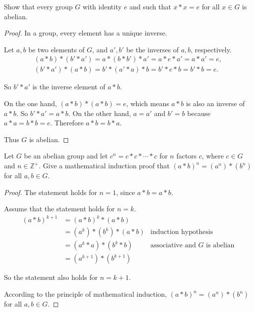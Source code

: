 \newpage
\begin{exercise}
    Show that every group $G$ with identity $e$ and such that $x * x = e$ for all $x\in G$ is abelian.
\end{exercise}

\begin{proof}
    In a group, every element has a unique inverse.

    Let $a, b$ be two elements of $G$, and $a', b'$ be the inverses of $a, b$, respectively.
    \[
        \begin{split}
            (a * b) * (b' * a') = a * (b * b') * a' = a * e * a' = a * a' = e, \\
            (b' * a') * (a * b) = b' * (a' * a) * b = b' * e * b = b' * b = e.
        \end{split}
    \]

    So $b' * a'$ is the inverse element of $a * b$.

    On the one hand, $(a * b) * (a * b) = e$, which means $a * b$ is also an inverse of $a * b$. So $b' * a' = a * b$. On the other hand, $a = a'$ and $b' = b$ because $a * a = b * b = e$. Therefore $a * b = b * a$.

    Thus $G$ is abelian.
\end{proof}

\newpage
\begin{exercise}
    Let $G$ be an abelian group and let $c^{n} = c * c * \cdots * c$ for $n$ factors $c$, where $c\in G$ and $n\in\mathbb{Z}^{+}$. Give a mathematical induction proof that ${(a * b)}^{n} = (a^{n}) * (b^{n})$ for all $a, b\in G$.
\end{exercise}

\begin{proof}
    The statement holds for $n = 1$, since $a * b = a * b$.

    Assume that the statement holds for $n = k$.
    \begin{align*}
        {(a * b)}^{k+1} & = {(a * b)}^{k} * (a * b)                                             \\
                        & = (a^{k}) * (b^{k}) * (a * b) & \text{induction hypothesis}           \\
                        & = (a^{k} * a) * (b^{k} * b)   & \text{associative and $G$ is abelian} \\
                        & = (a^{k+1}) * (b^{k+1})
    \end{align*}

    So the statement also holds for $n = k + 1$.

    According to the principle of mathematical induction, ${(a * b)}^{n} = (a^{n}) * (b^{n})$ for all $a, b\in G$.
\end{proof}

